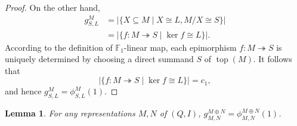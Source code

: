 \documentclass[12pt]{amsart}
\newtheorem{lemma}[theorem]{Lemma}
\theoremstyle{remark}
\theoremstyle{definition}
\numberwithin{equation}{section}
\begin{document}
\begin{proof}
On the other hand,
\begin{align*}
    g_{S,L}^M&=|\{X\subseteq M\mid X\cong L, M/X\cong S\}|\\
    &=|\{f:M\twoheadrightarrow S\mid \ker f\cong L\}|.
\end{align*}
According to the definition of $\mathbb{F}_1$-linear map, each epimorphism $f:M\twoheadrightarrow S$ is uniquely determined by choosing a direct summand $S$ of $\operatorname{top}(M)$. It follows  that \[|\{f:M\twoheadrightarrow S\mid \ker f\cong L\}|=c_1,\] and hence $g_{S,L}^M=\phi_{S,L}^M(1)$.

\end{proof}

\begin{lemma}\label{lem:split-sum-hall-number-F1}
    For any representations $M,N$ of $(Q,I)$, $g_{M,N}^{M\oplus N}=\phi_{M,N}^{M\oplus N}(1)$.
\end{lemma}
\end{document}
